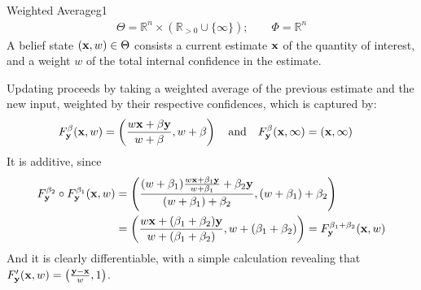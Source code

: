 \documentclass{article}
\begin{document}
\begin{examplex}{Weighted Average}{g1}
    \begin{align*}
        \Theta = \mathbb R^n \times (\mathbb R_{> 0} \cup \{\infty\});
        \qquad
        \Phi = \mathbb R^n %
    \end{align*}
    A belief state $(\mathbf{x},w) \in \Theta$ consists a current estimate $\mathbf{x}$ of the quantity of interest, and a weight $w$ of the total internal confidence in the estimate.

    Updating proceeds by taking a weighted average of the previous estimate and the new input, weighted by their respective confidences, which is captured by:
    \begin{align*}
        F^\beta_{\mathbf{y}}(\mathbf{x}, w) &=  \left( \frac{ w \mathbf{x} + \beta \mathbf{y}}{w + \beta} , w + \beta \right)
        \quad\text{and}\quad
        F^{\beta}_{\mathbf{y}}(\mathbf{x}, \infty) = (\mathbf{x}, \infty)
    \end{align*}
    It is additive, since
    \begin{align*}
        F^{\beta_2}_{\mathbf{y}} \circ F^{\beta_1}_{\mathbf{y}}(\mathbf{x}, w)
        &= \left( \frac{ (w + \beta_1) \frac{ w \mathbf{x} + \beta_1 \mathbf{y}}{w + \beta_1} + \beta_2 \mathbf{y}}{(w + \beta_1) + \beta_2}, (w  + \beta_1) + \beta_2 \right) \\
        &= \left( \frac{  w \mathbf{x} + (\beta_1 + \beta_2) \mathbf{y}}{w + (\beta_1 + \beta_2)}, w  + (\beta_1 + \beta_2)\right)
        = F^{\beta_1 + \beta_2}_{\mathbf{y}}(\mathbf{x}, w)
    \end{align*}
    And it is clearly differentiable, with a simple calculation revealing that
    $ F'_{\mathbf{y}}(\mathbf{x}, w) = \left( \frac{\mathbf{y} - \mathbf{x}}{w}, 1\right) $.


\end{examplex}
\end{document}

